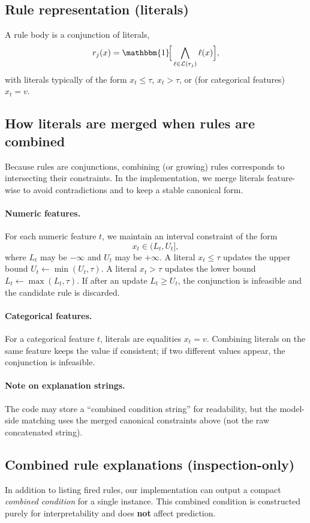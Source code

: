 \documentclass[11pt,a4paper]{article}
\providecommand{\mc}[1]{#1}
\renewcommand{\mc}[1]{\mathcal{#1}}
\providecommand{\1}{}
\renewcommand{\1}{\mathbbm{1}}
\begin{document}
\subsection{Rule representation (literals)}
A rule body is a conjunction of literals,
\[
r_j(x)=\1\!\Big[\bigwedge_{\ell\in\mc{L}(r_j)} \ell(x)\Big],
\]
with literals typically of the form $x_t\le \tau$, $x_t > \tau$, or (for categorical features) $x_t = v$.

\subsection{How literals are merged when rules are combined}
Because rules are conjunctions, combining (or growing) rules corresponds to intersecting their constraints.
In the implementation, we merge literals feature-wise to avoid contradictions and to keep a stable canonical form.

\paragraph{Numeric features.}
For each numeric feature $t$, we maintain an interval constraint of the form
\[
x_t \in (L_t, U_t],
\]
where $L_t$ may be $-\infty$ and $U_t$ may be $+\infty$.
A literal $x_t \le \tau$ updates the upper bound $U_t \leftarrow \min(U_t,\tau)$.
A literal $x_t > \tau$ updates the lower bound $L_t \leftarrow \max(L_t,\tau)$.
If after an update $L_t \ge U_t$, the conjunction is infeasible and the candidate rule is discarded.

\paragraph{Categorical features.}
For a categorical feature $t$, literals are equalities $x_t=v$.
Combining literals on the same feature keeps the value if consistent; if two different values appear, the conjunction is infeasible.

\paragraph{Note on explanation strings.}
The code may store a ``combined condition string'' for readability, but the model-side matching uses the merged canonical constraints above (not the raw concatenated string).

\subsection{Combined rule explanations (inspection-only)}
\label{sec:combined-rule-expl}
In addition to listing fired rules, our implementation can output a compact \emph{combined condition} for a single instance.
This combined condition is constructed purely for interpretability and does \textbf{not} affect prediction.
\end{document}

